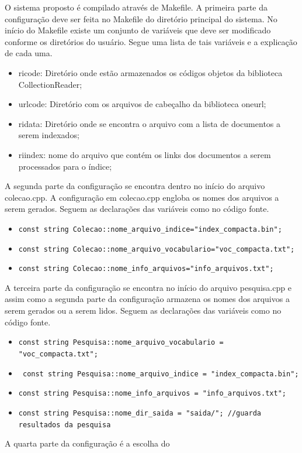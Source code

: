 \documentclass[a4paper]{article}
\begin{document}
O sistema proposto é compilado através de Makefile. A primeira parte da configuração 
deve ser feita no Makefile do diretório principal do sistema. No início do Makefile 
existe um conjunto de variáveis que deve ser modificado conforme os diretórios 
do usuário. Segue uma lista de tais variáveis e a explicação de cada uma.

   \begin{itemize}
      \item  ricode: Diretório onde estão armazenados os códigos objetos da biblioteca CollectionReader;
      \item  urlcode: Diretório com os arquivos de cabeçalho da biblioteca oneurl;
      \item ridata: Diretório onde se encontra o arquivo com a lista de documentos a serem indexados;
      \item  riindex: nome do arquivo que contém os links dos documentos a serem processados para o índice;
  \end{itemize}

A segunda parte da configuração se encontra dentro no início do arquivo colecao.cpp. A configuração 
em colecao.cpp engloba os nomes dos arquivos a serem gerados. Seguem as declarações 
das variáveis como no código fonte.

    \begin{itemize}
      \item  \texttt{const string Colecao::nome\_arquivo\_indice="index\_compacta.bin";}
      \item \texttt{const string Colecao::nome\_arquivo\_vocabulario="voc\_compacta.txt";}
      \item  \texttt{const string Colecao::nome\_info\_arquivos="info\_arquivos.txt";}
     \end{itemize}

A terceira parte da configuração se encontra no início do arquivo pesquisa.cpp e assim como 
a segunda parte da configuração armazena os nomes dos arquivos a serem gerados ou a serem lidos.
Seguem as declarações das variáveis como no código fonte.
 
   \begin{itemize}
      \item \texttt{const string Pesquisa::nome\_arquivo\_vocabulario = "voc\_compacta.txt";}
      \item \texttt{ const string Pesquisa::nome\_arquivo\_indice = "index\_compacta.bin";}
      \item  \texttt{const string Pesquisa::nome\_info\_arquivos = "info\_arquivos.txt";} 
      \item \texttt{const string Pesquisa::nome\_dir\_saida = "saida/"; //guarda resultados da pesquisa}
    \end{itemize}
    A quarta parte da configuração é a escolha do 
\end{document}

